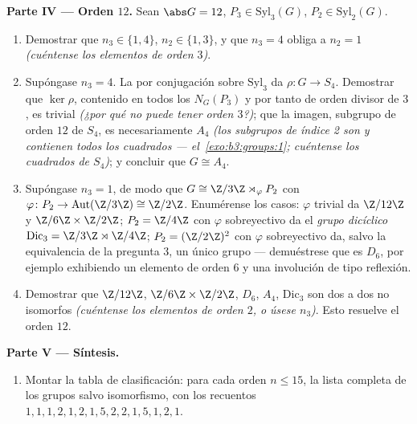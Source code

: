 \begin{problem}
\medskip
\noindent\textbf{Parte IV --- Orden $12$.} Sean $\abs G = 12$, $P_3
\in \mathrm{Syl}_3(G)$, $P_2 \in \mathrm{Syl}_2(G)$.
\begin{enumerate}[resume]
  \item Demostrar que $n_3 \in \{1, 4\}$, $n_2 \in \{1, 3\}$, y que $n_3
        = 4$ obliga a $n_2 = 1$ \emph{(cuéntense los elementos de orden
        $3$)}.
  \item Supóngase $n_3 = 4$. La 
  por conjugación sobre $\mathrm{Syl}_3$ da $\rho \colon G \to S_4$.
  Demostrar que $\ker \rho$, contenido en todos los $N_G(P_3)$ y por
  tanto de orden divisor de $3$, es trivial \emph{(¿por qué no puede
  tener orden $3$?)}; que la imagen, subgrupo de orden $12$ de $S_4$, es
  necesariamente $A_4$ \emph{(los subgrupos de índice 2 son
   y contienen todos los
  cuadrados --- el~\cref{exo:b3:groups:1}; cuéntense los cuadrados de
  $S_4$)}; y concluir que $G \cong A_4$. \item Supóngase $n_3 = 1$, de
  modo que $G \cong \Z/3\Z \rtimes_\varphi P_2$ con
  $\varphi \colon P_2 \to \operatorname{Aut}(\Z/3\Z)
        \cong \Z/2\Z$. Enumérense los casos: $\varphi$ trivial da
  $\Z/12\Z$ y $\Z/6\Z \times \Z/2\Z$; $P_2 =
        \Z/4\Z$ con $\varphi$ sobreyectivo da el \emph{grupo dicíclico}
  $\mathrm{Dic}_3 = \Z/3\Z \rtimes
        \Z/4\Z$; $P_2 = (\Z/2\Z)^2$ con $\varphi$ sobreyectivo da, salvo
  la equivalencia de la pregunta 3, un único grupo --- demuéstrese que
  es $D_6$, por ejemplo exhibiendo un elemento de orden $6$ y una
  involución de tipo reflexión. \item Demostrar que $\Z/12\Z$,
  $\Z/6\Z \times \Z/2\Z$, $D_6$, $A_4$, $\mathrm{Dic}_3$ son dos a dos
  no isomorfos \emph{(cuéntense los elementos de orden $2$, o úsese
  $n_3$)}. Esto resuelve el orden
        $12$.
\end{enumerate}

\medskip
\noindent\textbf{Parte V --- Síntesis.}
\begin{enumerate}[resume]
  \item Montar la tabla de clasificación: para cada orden $n \leq
        15$, la lista completa de los grupos salvo isomorfismo, con los
  recuentos $1, 1, 1, 2, 1, 2, 1, 5, 2, 2, 1, 5, 1, 2, 1$.
\end{enumerate}


\end{problem}

